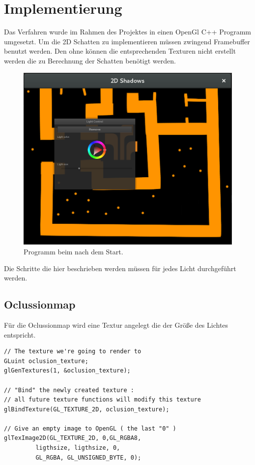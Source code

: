 \chapter{Implementierung}
Das Verfahren wurde im Rahmen des Projektes in einen OpenGl C++ Programm umgesetzt.
Um die 2D Schatten zu implementieren müssen zwingend Framebuffer benutzt werden.
Den ohne können die entsprechenden Texturen nicht erstellt werden die zu Berechnung der Schatten benötigt werden. 
\begin{figure}
	\centering
	\includegraphics[scale=0.25]{images/Bildschirmfoto_1.png}
	\caption{Programm beim nach dem Start.}
	\label{p_1}
\end{figure}

Die Schritte die hier beschrieben werden müssen für jedes Licht durchgeführt werden.

\section{Oclussionmap}

Für die Oclussionmap wird eine Textur angelegt die der Größe des Lichtes entspricht.
\begin{lstlisting}
// The texture we're going to render to
GLuint oclusion_texture;
glGenTextures(1, &oclusion_texture);

// "Bind" the newly created texture : 
// all future texture functions will modify this texture
glBindTexture(GL_TEXTURE_2D, oclusion_texture);

// Give an empty image to OpenGL ( the last "0" )
glTexImage2D(GL_TEXTURE_2D, 0,GL_RGBA8,
		 ligthsize, ligthsize, 0,
		 GL_RGBA, GL_UNSIGNED_BYTE, 0);
\end{lstlisting}

